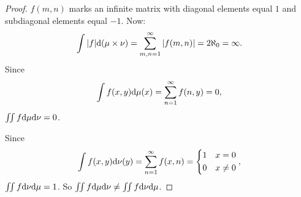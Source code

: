 \begin{proof}
    $f(m,n)$ marks an infinite matrix 
    with diagonal elements equal $1$ and subdiagonal elements equal $-1$. 
    Now:
    \begin{displaymath}
        \int|f|\mathrm{d}(\mu\times\nu)
        =\sum_{m,n=1}^{\infty}|f(m,n)|
        =2\aleph_{0}=\infty.
    \end{displaymath}
    Since 
    \begin{displaymath}
        \int f(x,y)\mathrm{d}\mu(x)
        =\sum_{n=1}^{\infty}f(n,y)
        =0,
    \end{displaymath}
    $\iint f\mathrm{d}\mu\mathrm{d}\nu=0$.

    Since 
    \begin{displaymath}
        \int f(x,y)\mathrm{d}\nu(y)
        =\sum_{n=1}^{\infty}f(x,n)
        =\left\{
            \begin{aligned}
                1&\quad x=0\\
                0&\quad x\neq 0\\
            \end{aligned}
        \right.,
    \end{displaymath}
    $\iint f\mathrm{d}\nu\mathrm{d}\mu=1$. 
    So $\iint f\mathrm{d}\mu\mathrm{d}\nu\neq\iint f\mathrm{d}\nu\mathrm{d}\mu$.
\end{proof}